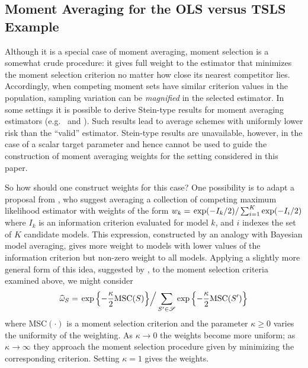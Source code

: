 \subsection{Moment Averaging for the OLS versus TSLS Example}
\label{sec:momentavgexample}
Although it is a special case of moment averaging, moment selection is a somewhat crude procedure: it gives full weight to the estimator that minimizes the moment selection criterion no matter how close its nearest competitor lies. 
Accordingly, when competing moment sets have similar criterion values in the population, sampling variation can be \emph{magnified} in the selected estimator. 
In some settings it is possible to derive Stein-type results for moment averaging estimators (e.g.\ \cite{Hansen2014} and \cite{ChengLiaoShi}).
Such results lead to average schemes with uniformly lower risk than the ``valid'' estimator.
Stein-type results are unavailable, however, in the case of a scalar target parameter and hence cannot be used to guide the construction of moment averaging weights for the setting considered in this paper.

So how should one construct weights for this case?
One possibility is to adapt a proposal from \cite{Burnhametal}, who suggest averaging a collection of competing maximum likelihood estimator with weights of the form 
$w_k =\left. \exp(-I_k/2)\right/\sum_{i=1}^K \exp(-I_i/2)$
where $I_k$ is an information criterion evaluated for model $k$, and $i$ indexes the set of $K$ candidate models. 
This expression, constructed by an analogy with Bayesian model averaging, gives more weight to models with lower values of the information criterion but non-zero weight to all models. 
Applying a slightly more general form of this idea, suggested by \cite{ClaeskensHjortbook}, to the moment selection criteria examined above, we might consider 
\[		\widehat{\omega}_S = \left.\exp\left\{-\frac{\kappa}{2} \mbox{MSC}(S)\right\}\right/\sum_{S' \in \mathscr{S}}\exp\left\{-\frac{\kappa}{2} \mbox{MSC}(S')\right\}\]
where MSC$(\cdot)$ is a moment selection criterion and the parameter $\kappa \geq 0$ varies the uniformity of the weighting. 
As $\kappa \rightarrow 0$ the weights become more uniform; as $\kappa \rightarrow \infty$ they approach the moment selection procedure given by minimizing the corresponding criterion. 
Setting $\kappa = 1$ gives the \cite{Burnhametal} weights.

